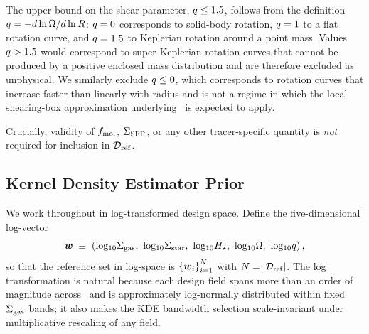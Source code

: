 The upper bound on the shear parameter, $q \leq 1.5$, follows from
the definition $q = -d\ln\Omega/d\ln R$: $q=0$ corresponds to
solid-body rotation, $q=1$ to a flat rotation curve, and
$q=1.5$ to Keplerian rotation around a point mass. Values
$q > 1.5$ would correspond to super-Keplerian rotation curves that
cannot be produced by a positive enclosed mass distribution and are
therefore excluded as unphysical. We similarly exclude $q \leq 0$,
which corresponds to rotation curves that increase faster than linearly
with radius and is not a regime in which the local shearing-box
approximation underlying \TIGRESS\ is expected to apply.

Crucially, validity of $f_{\rm mol}$, $\Sigma_{\rm SFR}$, or any other tracer-specific
quantity is \emph{not} required for inclusion in $\mathcal{D}_{\rm ref}$. 

\subsection{Kernel Density Estimator Prior}
\label{sec:sampling:kde}

We work throughout in log-transformed design space. Define the
five-dimensional log-vector
\begin{equation}
\bm{w} \;\equiv\;
\rbrackets{\log\Sgas,\ \log\Sstar,\ \log\Hstar,\ \log\Omrot,\ \log\qshear},
\label{eq:w_def}
\end{equation}
so that the reference set in log-space is $\left\{{\bm{w}_i}\right\}_{i=1}^{N}$
with $N = |\mathcal{D}_{\rm ref}|$. The log transformation is natural because each design
field spans more than an order of magnitude across \PHANGS\ and is
approximately log-normally distributed within fixed $\Sigma_{\rm gas}$ bands; it also
makes the KDE bandwidth selection scale-invariant under multiplicative
rescaling of any field.

